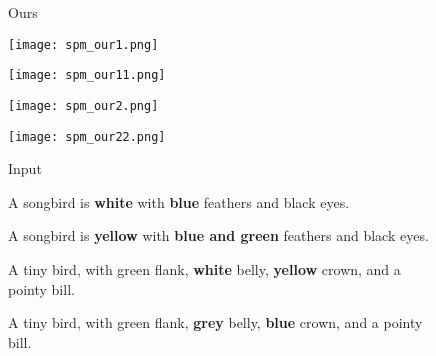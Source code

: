 \documentclass{article}
\begin{document}
\begin{figure}[t]
\begin{minipage}{0.48\textwidth}
\begin{minipage}{0.184\textwidth}
\centering
\tiny{Ours}
\end{minipage}
\begin{minipage}{0.184\textwidth}
\texttt{[image: spm\_our1.png]}
\end{minipage}
\noindent\begin{minipage}{0.184\textwidth}
\texttt{[image: spm\_our11.png]}
\end{minipage}
\noindent\begin{minipage}{0.184\textwidth}
\texttt{[image: spm\_our2.png]}
\end{minipage}
\noindent\begin{minipage}{0.184\textwidth}
\texttt{[image: spm\_our22.png]}
\end{minipage}
\end{minipage}
\begin{minipage}{0.01\textwidth}
\centering





\end{minipage}
\begin{minipage}{0.48\textwidth}
\noindent\begin{minipage}{0.184\textwidth}
\centering
\tiny{Input}
\end{minipage}
\noindent\begin{minipage}{0.184\textwidth}
\centering
\tiny{A songbird is \textbf{white} with \textbf{blue} feathers and black eyes.}
\end{minipage}
\noindent\begin{minipage}{0.184\textwidth}
\centering
\tiny{A songbird is \textbf{yellow} with \textbf{blue and green} feathers and black eyes.}
\end{minipage}
\noindent\begin{minipage}{0.184\textwidth}
\centering
\tiny{A tiny bird, with green flank, \textbf{white} belly, \textbf{yellow} crown, and a pointy bill.}
\end{minipage}
\noindent\begin{minipage}{0.184\textwidth}
\centering
\tiny{A tiny bird, with green flank, \textbf{grey} belly, \textbf{blue} crown, and a pointy bill.}
\end{minipage}
\smallskip


\end{minipage}
\end{figure}
\end{document}
